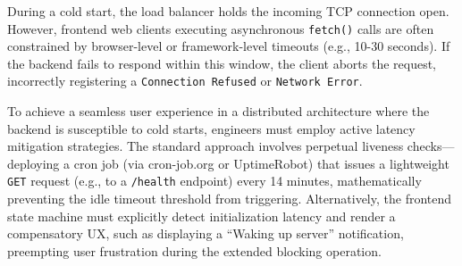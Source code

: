 \documentclass[11pt,a4paper]{article}
\begin{document}
During a cold start, the load balancer holds the incoming TCP connection open. However, frontend web clients executing asynchronous \texttt{fetch()} calls are often constrained by browser-level or framework-level timeouts (e.g., 10-30 seconds). If the backend fails to respond within this window, the client aborts the request, incorrectly registering a \texttt{Connection Refused} or \texttt{Network Error}.

To achieve a seamless user experience in a distributed architecture where the backend is susceptible to cold starts, engineers must employ active latency mitigation strategies. The standard approach involves perpetual liveness checks---deploying a cron job (via cron-job.org or UptimeRobot) that issues a lightweight \texttt{GET} request (e.g., to a \texttt{/health} endpoint) every 14 minutes, mathematically preventing the idle timeout threshold from triggering. Alternatively, the frontend state machine must explicitly detect initialization latency and render a compensatory UX, such as displaying a ``Waking up server'' notification, preempting user frustration during the extended blocking operation.
\end{document}
